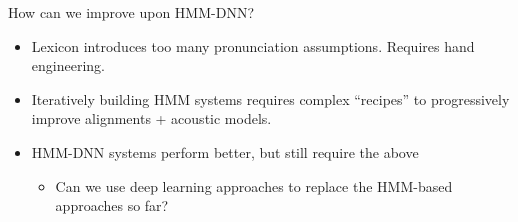 \begin{frame}{How can we improve upon HMM-DNN?}
  \begin{itemize}
    \item Lexicon introduces too many pronunciation assumptions. Requires hand engineering.
    \item Iteratively building HMM systems requires complex ``recipes'' to progressively improve alignments + acoustic models.
    \item HMM-DNN systems perform better, but still require the above
    \begin{itemize}
      \item Can we use deep learning approaches to replace the HMM-based approaches so far?
    \end{itemize}
  \end{itemize}
  \vspace{1em}
\end{frame}
